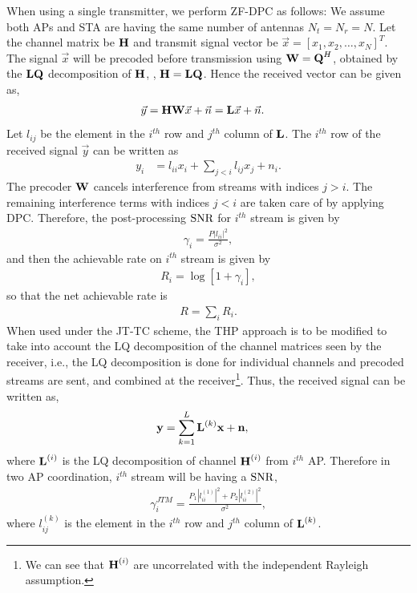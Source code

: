 When using a single transmitter, we perform ZF-DPC as  follows: 
We assume both APs and STA are having the same number of antennas $N_t=N_r=N$.
Let the channel matrix be $\textbf{H}$ and transmit signal vector be $\Vec{x} = [x_1,x_2,\hdots, x_{N}]^T$. The signal $\Vec{x}$ will be precoded before transmission using $\textbf{W} = \textbf{Q}^H$, obtained by the $\textbf{L} \textbf{Q}$ decomposition of $\textbf{H}$, \ie, $\textbf{H}=\textbf{L} \textbf{Q}$. Hence the received vector can be given as,  
\begin{align}
    \Vec{y} &= \textbf{H} \textbf{W} \Vec{x}+ \Vec{n} = \textbf{L} \Vec{x}+\Vec{n}.
    \label{eq:DF_DPC}
\end{align}
Let $l_{ij}$ be the element in the $i^{th}$ row and $j^{th}$ column of $\textbf{L}$. The $i^{th}$ row of the received signal $\Vec{y}$ can be written as 
\begin{align*}
{y_i} &= {l_{ii} x_{i} + \sum_{j<i} l_{ij} x_j + n_i}.
\end{align*}
The precoder $\textbf{W}$ cancels interference from streams with indices $j>i$. The remaining interference terms with indices $j<i$ are taken care of by applying DPC. Therefore, the post-processing $\text{SNR}$ for $i^{th}$ stream is given by
\begin{align}\label{eq:sinr-downlink}
\gamma_{i}=\frac{P|l_{ii}|^2}{\sigma^2},
\end{align}
and then the achievable rate on $i^{th}$ stream is given by
\begin{align}\label{eqn:per_stream_rate}
R_i = \log [ 1+\gamma_i],
\end{align}
so that the net achievable rate is 
\begin{align}\label{eqn:net_rate_gen}
R = \sum_{i} R_i.
\end{align}
When used under the JT-TC scheme, the THP approach is to be modified to take into account the LQ decomposition of the channel matrices seen by the receiver, i.e., the LQ decomposition is done for individual channels and precoded streams are sent, and combined at the receiver\footnote{We can see that $\textbf{H}^{(i)}$ are uncorrelated with the independent Rayleigh assumption.}. Thus, the received signal can be written as,
\begin{align}
\textbf{y}&=\sum_{k=1}^{L}\textbf{L}^{(k)}\textbf{x}+\textbf{n},
\label{eq:DF_DPC_adv}
\end{align}
where $\textbf{L}^{(i)}$ is the LQ decomposition of channel $\textbf{H}^{(i)}$ from $i^{th}$ AP.
Therefore in two AP coordination, $i^{th}$ stream will be having a $\text{SNR}$,
\begin{align}\label{eqn:SNR_JT_MIMO}
\gamma^{JTM}_i=\frac{P_1 |l^{(1)}_{ii}|^2+P_2 |l^{(2)}_{ii}|^2}{\sigma^2},
\end{align} 
where $l^{(k)}_{ij}$ is the element in the $i^{th}$ row and $j^{th}$ column of $\textbf{L}^{(k)}$. 

